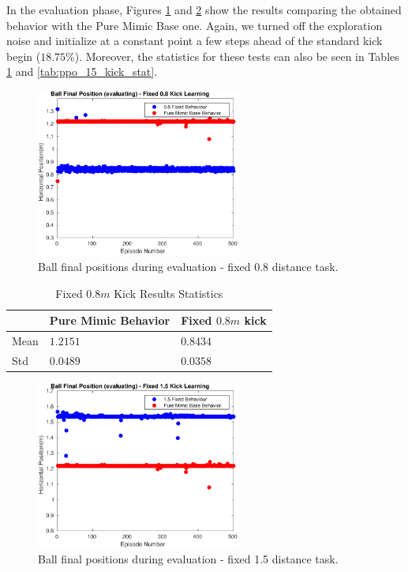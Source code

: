In the evaluation phase, Figures \ref{fig:RL_08_kick_pos_eval} and \ref{fig:RL_15_kick_pos_eval} show the results comparing the obtained behavior with the Pure Mimic Base one. Again, we turned off the exploration noise and initialize at a constant point a few steps ahead of the standard kick begin ($18.75\%$). Moreover, the statistics for these tests can also be seen in Tables \ref{tab:ppo_08_kick_stat} and \ref{tab:ppo_15_kick_stat}.

\begin{figure}[H]
    \centering
    \includegraphics[width=0.6\textwidth]{Chapter7/plots/plot_ball_pos_08fix_kick_eval.pdf} 
    \caption{Ball final positions during evaluation - fixed 0.8 distance task.}
    \label{fig:RL_08_kick_pos_eval}
\end{figure}

\begin{table}[ht]
    \begin{tabular}{|l|l|l|}
    \hline
      &     Pure Mimic Behavior  &    Fixed $0.8m$ kick  \\ \hline
    Mean             &    $1.2151$  &   $0.8434$    \\
    Std              &    $0.0489$   &  $0.0358$   \\ \hline
    \end{tabular}
\centering
\caption{Fixed $0.8m$ Kick Results Statistics}
\label{tab:ppo_08_kick_stat}
\end{table}

\begin{figure}[H]
    \centering
    \includegraphics[width=0.6\textwidth]{Chapter7/plots/plot_ball_pos_15fix_kick_eval.pdf} 
    \caption{Ball final positions during evaluation - fixed 1.5 distance task.}
    \label{fig:RL_15_kick_pos_eval}
\end{figure}

